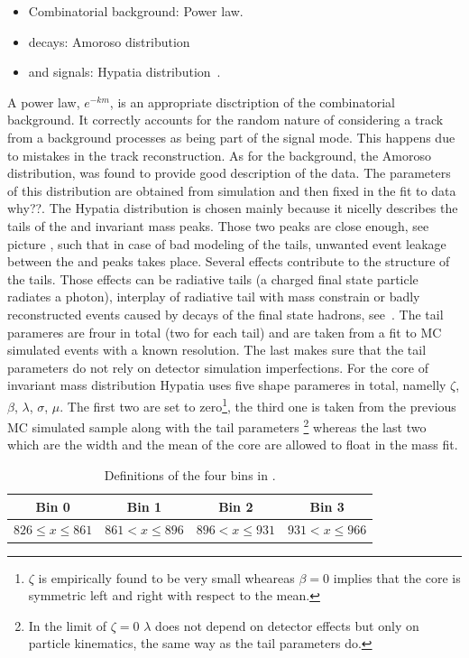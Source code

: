 \begin{itemize}
\item Combinatorial background: Power law.
\item \LbJpsippi decays: Amoroso distribution~\cite{Amoroso}
\item \Bd and \Bs signals: Hypatia distribution~\cite{Santos:2013gra}.
\end{itemize}

\noindent A power law, $e^{-km}$, is an appropriate disctription of the combinatorial background. It correctly accounts for the random nature
of considering a track from a background processes as being part of the signal mode. This happens due to mistakes in the track reconstruction.
As for the \LbJpsippi background, the Amoroso distribution, was found to provide good description of the data. The parameters of this distribution
are obtained from simulation and then fixed in the fit to data {\color{red} why??}. The Hypatia distribution
is chosen mainly because it nicelly describes the tails of the \Bs and \Bd invariant mass peaks. Those two peaks are close enough,
see picture , such that in case of bad modeling of the tails, unwanted event leakage between the \Bs and \Bd peaks 
takes place. Several effects contribute to the structure of the tails. Those effects can be radiative tails (a charged final state 
particle radiates a photon), interplay of radiative tail with \Jpsi mass constrain or badly reconstructed events caused by decays 
of the final state hadrons, see~\cite{Santos:2013gra}. The tail parameres are frour in total (two for each tail) and are taken
from a fit to MC simulated events with a known resolution. The last makes sure that the tail parameters do not rely on detector 
simulation imperfections. For the core of invariant mass distribution Hypatia uses five shape parameres in total, namelly $\zeta$, 
$\beta$, $\lambda$, $\sigma$, $\mu$. The first two are set to zero\footnote{$\zeta$ is empirically found to be very small wheareas
$\beta = 0$ implies that the core is symmetric left and right with respect to the mean.}, the third one is taken from the previous
MC simulated sample along with the tail parameters \footnote{In the limit of $\zeta = 0$ $\lambda$ does not depend on detector 
effects but only on particle kinematics, the same way as the tail parameters do.} whereas the last two which are the width and 
the mean of the core are allowed to float in the mass fit.

\begin{table}[!h]
\centering
\begin{tabular}{c|c|c|c}
\hline
 Bin 0 & Bin 1 & Bin 2 & Bin 3\\	
\hline
\multirow{2}{*}{$ 826 \leq x \leq 861 $} & \multirow{2}{*}{$ 861 < x \leq 896 $} & \multirow{2}{*}{$ 896 < x \leq 931 $}& \multirow{2}{*}{$ 931 < x \leq 966 $} \\
					      	 					  &   &	& \\	
\hline
 \end{tabular}
\caption{Definitions of the four \mkpi bins in \mevcc.}
\label{Kbindef}
\end{table}


